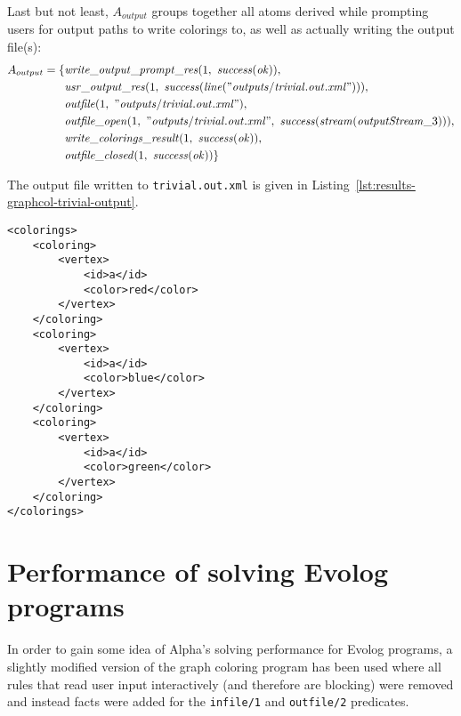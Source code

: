 \begin{example}
Last but not least, $A_{output}$ groups together all atoms derived while prompting users for output paths to write colorings to, as well as actually writing the output file(s):
\begin{align*}
    A_{output} = \{&\mathit{write\_output\_prompt\_res}(1,~\mathit{success}(\mathit{ok})),\\
                   &\mathit{usr\_output\_res}(1,~\mathit{success}(\mathit{line}(\mathit{"outputs/trivial.out.xml"}))),\\
                   &\mathit{outfile}(1,~\mathit{"outputs/trivial.out.xml"}),\\
                   &\mathit{outfile\_open}(1,~\mathit{"outputs/trivial.out.xml"},~\mathit{success}(\mathit{stream}(\mathit{outputStream}\_3))),\\
                   &\mathit{write\_colorings\_result}(1,~\mathit{success}(\mathit{ok})),\\
                   &\mathit{outfile\_closed}(1,~\mathit{success}(\mathit{ok}))\}
\end{align*}

The output file written to \texttt{trivial.out.xml} is given in Listing~\ref{lst:results-graphcol-trivial-output}.

\begin{lstlisting}[style=asp-code, label={lst:results-graphcol-trivial-output}, caption={XML encoding of caluclated colorings for the input file from Listing~\ref{lst:results-graphcol-trivial-input}}]
<colorings>
	<coloring>
		<vertex>
			<id>a</id>
			<color>red</color>
		</vertex>
	</coloring>
	<coloring>
		<vertex>
			<id>a</id>
			<color>blue</color>
		</vertex>
	</coloring>
	<coloring>
		<vertex>
			<id>a</id>
			<color>green</color>
		</vertex>
	</coloring>
</colorings>    
\end{lstlisting}
\end{example}
 

\section{Performance of solving Evolog programs}
\label{sec:results-performance-tests}

In order to gain some idea of Alpha's solving performance for Evolog programs, a slightly modified version of the graph coloring program has been used where all rules that read user input interactively (and therefore are blocking) were removed and instead facts were added for the \texttt{infile/1} and \texttt{outfile/2} predicates.

